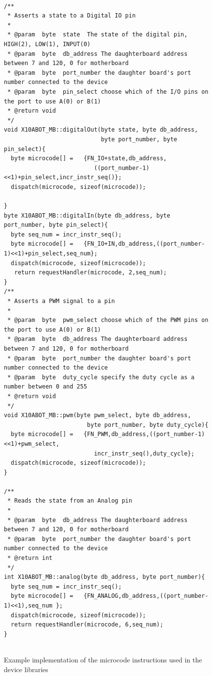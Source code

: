 \begin{figure}[h]
\footnotesize
{\fontsize{8}{6}\selectfont
\begin{verbatim}

/**
 * Asserts a state to a Digital IO pin
 *
 * @param  byte  state  The state of the digital pin, HIGH(2), LOW(1), INPUT(0)
 * @param  byte  db_address The daughterboard address between 7 and 120, 0 for motherboard
 * @param  byte  port_number the daughter board's port number connected to the device
 * @param  byte  pin_select choose which of the I/O pins on the port to use A(0) or B(1)
 * @return void
 */
void X10ABOT_MB::digitalOut(byte state, byte db_address, 
                            byte port_number, byte pin_select){
  byte microcode[] =   {FN_IO+state,db_address,
                          ((port_number-1)<<1)+pin_select,incr_instr_seq()};
  dispatch(microcode, sizeof(microcode));

}
byte X10ABOT_MB::digitalIn(byte db_address, byte port_number, byte pin_select){
  byte seq_num = incr_instr_seq();
  byte microcode[] =   {FN_IO+IN,db_address,((port_number-1)<<1)+pin_select,seq_num};
  dispatch(microcode, sizeof(microcode));
   return requestHandler(microcode, 2,seq_num);
}
/**
 * Asserts a PWM signal to a pin
 *
 * @param  byte  pwm_select choose which of the PWM pins on the port to use A(0) or B(1)
 * @param  byte  db_address The daughterboard address between 7 and 120, 0 for motherboard
 * @param  byte  port_number the daughter board's port number connected to the device
 * @param  byte  duty_cycle specify the duty cycle as a number between 0 and 255
 * @return void
 */
void X10ABOT_MB::pwm(byte pwm_select, byte db_address, 
                        byte port_number, byte duty_cycle){
  byte microcode[] =   {FN_PWM,db_address,((port_number-1)<<1)+pwm_select,
                          incr_instr_seq(),duty_cycle};
  dispatch(microcode, sizeof(microcode));
}

/**
 * Reads the state from an Analog pin
 *
 * @param  byte  db_address The daughterboard address between 7 and 120, 0 for motherboard
 * @param  byte  port_number the daughter board's port number connected to the device
 * @return int
 */
int X10ABOT_MB::analog(byte db_address, byte port_number){
  byte seq_num = incr_instr_seq();
  byte microcode[] =   {FN_ANALOG,db_address,((port_number-1)<<1),seq_num };
  dispatch(microcode, sizeof(microcode));
  return requestHandler(microcode, 6,seq_num);
}


\end{verbatim}
}
\caption{Example implementation of the \xten microcode instructions used in the device libraries} \label{code:micro}
\end{figure}	


